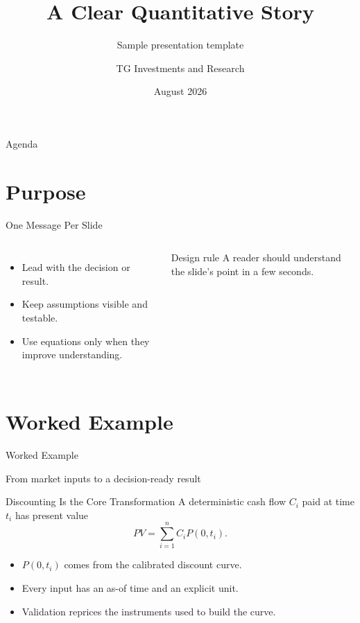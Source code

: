 \documentclass[aspectratio=169]{beamer}
\title{A Clear Quantitative Story}
\subtitle{Sample presentation template}
\author{TG Investments and Research}
\date{August 2026}
\begin{document}
\begin{frame}[plain]
  \titlepage
\end{frame}

\begin{frame}{Agenda}
  \tableofcontents
\end{frame}

\section{Purpose}

\begin{frame}{One Message Per Slide}
  \begin{columns}[T,onlytextwidth]
      \begin{itemize}
        \item Lead with the decision or result.
        \item Keep assumptions visible and testable.
        \item Use equations only when they improve understanding.
      \end{itemize}
      \begin{block}{Design rule}
        A reader should understand the slide's point in a few seconds.
      \end{block}
  \end{columns}
\end{frame}

\section{Worked Example}
\begin{frame}[plain]
  \begin{center}
    \vfill
    {\color{tgirnavy}Worked Example\par}
    \vspace{0.5em}
    {\large From market inputs to a decision-ready result\par}
    \vfill
  \end{center}
\end{frame}

\begin{frame}{Discounting Is the Core Transformation}
  A deterministic cash flow $C_i$ paid at time $t_i$ has present value
  \[
    PV = \sum_{i=1}^{n} C_i P(0,t_i).
  \]
  \begin{itemize}
    \item $P(0,t_i)$ comes from the calibrated discount curve.
    \item Every input has an as-of time and an explicit unit.
    \item Validation reprices the instruments used to build the curve.
  \end{itemize}
\end{frame}
\end{document}
